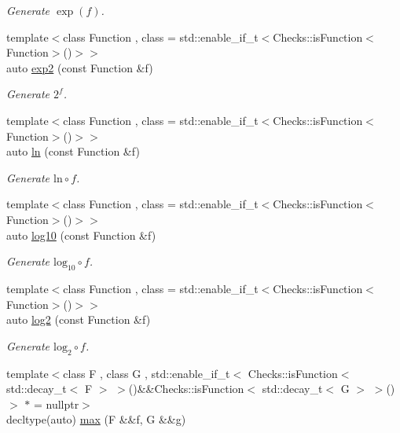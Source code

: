 \begin{DoxyCompactItemize}
\begin{DoxyCompactList}\small\item\em Generate $ \exp(f) $. \end{DoxyCompactList}\item 
{\footnotesize template$<$class Function , class  = std\+::enable\+\_\+if\+\_\+t$<$\+Checks\+::is\+Function$<$\+Function$>$()$>$$>$ }\\auto \hyperlink{group__CMathGroup_ga7724faf7db6e9583ac91df322c26ecf5}{exp2} (const Function \&f)
\begin{DoxyCompactList}\small\item\em Generate $2^f$. \end{DoxyCompactList}\item 
{\footnotesize template$<$class Function , class  = std\+::enable\+\_\+if\+\_\+t$<$\+Checks\+::is\+Function$<$\+Function$>$()$>$$>$ }\\auto \hyperlink{group__CMathGroup_ga31313571b08f65b853643e14fc8fc714}{ln} (const Function \&f)
\begin{DoxyCompactList}\small\item\em Generate $ \mathrm{ln}\circ f $. \end{DoxyCompactList}\item 
{\footnotesize template$<$class Function , class  = std\+::enable\+\_\+if\+\_\+t$<$\+Checks\+::is\+Function$<$\+Function$>$()$>$$>$ }\\auto \hyperlink{group__CMathGroup_gae9506f4e0e6fad4f756f636044697bfe}{log10} (const Function \&f)
\begin{DoxyCompactList}\small\item\em Generate $ \mathrm{log}_{10}\circ f $. \end{DoxyCompactList}\item 
{\footnotesize template$<$class Function , class  = std\+::enable\+\_\+if\+\_\+t$<$\+Checks\+::is\+Function$<$\+Function$>$()$>$$>$ }\\auto \hyperlink{group__CMathGroup_gacd6be7e9de7bbd54c852f0acf0c7d2c2}{log2} (const Function \&f)
\begin{DoxyCompactList}\small\item\em Generate $ \mathrm{log}_{2}\circ f $. \end{DoxyCompactList}\item 
{\footnotesize template$<$class F , class G , std\+::enable\+\_\+if\+\_\+t$<$ Checks\+::is\+Function$<$ std\+::decay\+\_\+t$<$ F $>$ $>$()\&\&\+Checks\+::is\+Function$<$ std\+::decay\+\_\+t$<$ G $>$ $>$() $>$ $\ast$  = nullptr$>$ }\\decltype(auto) \hyperlink{group__CMathGroup_ga29ce7b8f01cdb2c87da6b39f16d37925}{max} (F \&\&f, G \&\&g)

\end{DoxyCompactItemize}

